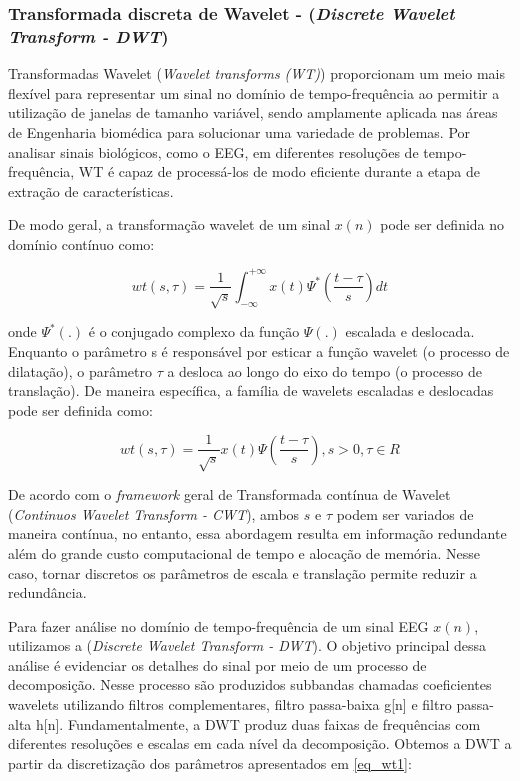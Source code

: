 \documentclass[10pt,journal,compsoc]{IEEEtran}
\begin{document}
\subsubsection{Transformada discreta de Wavelet - (\textit{Discrete Wavelet Transform - DWT})}

Transformadas Wavelet (\textit{Wavelet transforms (WT)}) proporcionam um meio mais flexível para representar um sinal no domínio de tempo-frequência ao permitir a utilização de janelas de tamanho variável, sendo amplamente aplicada nas áreas de Engenharia biomédica para solucionar uma variedade de problemas. Por analisar sinais biológicos, como o EEG, em diferentes resoluções de tempo-frequência, WT é capaz de processá-los de modo eficiente durante a etapa de extração de características. \cite{Sharmila2017670}

De modo geral, a transformação wavelet de um sinal $ x(n) $ pode ser definida no domínio contínuo como:

\begin{equation}\label{eq_wt1}
wt(s,\tau) = \frac{1}{\sqrt{s}} \int_{-\infty}^{+\infty} x(t)\Psi^*(\frac{t-\tau}{s})dt 
\end{equation} 

onde $ \Psi^*(.) $ é o conjugado complexo da função $ \Psi(.) $ escalada e deslocada. Enquanto o parâmetro s é responsável por esticar a função wavelet (o processo de dilatação), o parâmetro $\tau$ a desloca ao longo do eixo do tempo (o processo de translação). De maneira específica, a família de wavelets escaladas e deslocadas pode ser definida como:

\begin{equation}\label{eq_wt2}
wt(s,\tau) = \frac{1}{\sqrt{s}}x(t)\Psi(\frac{t-\tau}{s}), s > 0, \tau \in R  
\end{equation} 

De acordo com o \textit{framework} geral de Transformada contínua de Wavelet (\textit{Continuos Wavelet Transform - CWT}), ambos $ s $ e $ \tau $ podem ser variados de maneira contínua, no entanto, essa abordagem resulta em informação redundante além do grande custo computacional de tempo e alocação de memória. Nesse caso, tornar discretos os parâmetros de escala e translação permite reduzir a redundância. \cite{Kocadagli2017419}

Para fazer análise no domínio de tempo-frequência de um sinal EEG $ x(n) $, utilizamos a (\textit{Discrete Wavelet Transform - DWT}). O objetivo principal dessa análise é evidenciar os detalhes do sinal por meio de um processo de decomposição.  Nesse processo são produzidos subbandas chamadas coeficientes wavelets utilizando filtros complementares, filtro passa-baixa g[n] e filtro passa-alta h[n]. Fundamentalmente, a DWT produz duas faixas de frequências com diferentes resoluções e escalas em cada nível da decomposição. \cite{Kocadagli2017419}
Obtemos a DWT a partir da discretização dos parâmetros apresentados em \ref{eq_wt1}:
\end{document}
